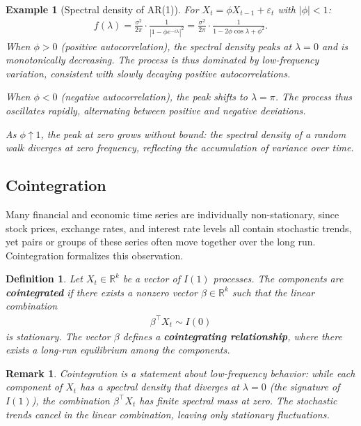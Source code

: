 \documentclass{report}
\theoremstyle{spacedplain}
\theoremstyle{spaceddefinition}
\newtheorem{definition}[theorem]{Definition}
\newtheorem{example}[theorem]{Example}
\theoremstyle{spacedremark}
\newtheorem{remark}[theorem]{Remark}
\begin{document}
\begin{example}[Spectral density of AR(1)]
For $X_t = \phi X_{t-1} + \varepsilon_t$ with $|\phi| < 1$:
\begin{align}
    f(\lambda) = \frac{\sigma^2}{2\pi} \cdot \frac{1}{|1 - \phi e^{-i\lambda}|^2} = \frac{\sigma^2}{2\pi} \cdot \frac{1}{1 - 2\phi\cos\lambda + \phi^2}.
\end{align}
When $\phi > 0$ (positive autocorrelation), the spectral density peaks at $\lambda = 0$ and is monotonically decreasing. The process is thus dominated by low-frequency variation, consistent with slowly decaying positive autocorrelations.

When $\phi < 0$ (negative autocorrelation), the peak shifts to $\lambda = \pi$. The process thus oscillates rapidly, alternating between positive and negative deviations.

As $\phi \uparrow 1$, the peak at zero grows without bound: the spectral density of a random walk diverges at zero frequency, reflecting the accumulation of variance over time.
\end{example}


\subsection{Cointegration}

Many financial and economic time series are individually non-stationary, since stock prices, exchange rates, and interest rate levels all contain stochastic trends, yet pairs or groups of these series often move together over the long run. Cointegration formalizes this observation.

\begin{definition}
Let $X_t \in \mathbb{R}^k$ be a vector of $I(1)$ processes. The components are \textbf{cointegrated} if there exists a nonzero vector $\beta \in \mathbb{R}^k$ such that the linear combination
\begin{align}
    \beta^\top X_t \sim I(0)
\end{align}
is stationary. The vector $\beta$ defines a \textbf{cointegrating relationship}, where there exists a long-run equilibrium among the components.
\end{definition}

\begin{remark}
Cointegration is a statement about low-frequency behavior: while each component of $X_t$ has a spectral density that diverges at $\lambda = 0$ (the signature of $I(1)$), the combination $\beta^\top X_t$ has finite spectral mass at zero. The stochastic trends cancel in the linear combination, leaving only stationary fluctuations.
\end{remark}
\end{document}
